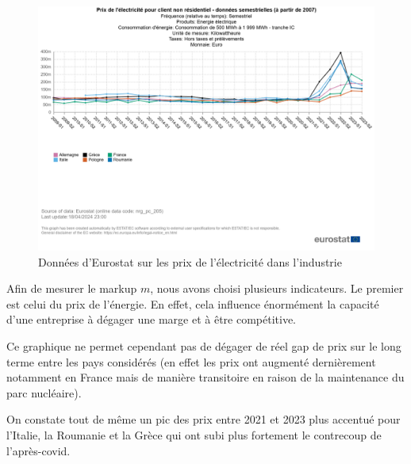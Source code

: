\documentclass{article}
\begin{document}
\begin{figure}[H]
  \centering
  \begin{minipage}{0.8\textwidth}
      \centering
      \includegraphics[width=\textwidth]{"prix_elec_2.png"}
      \caption{Données d'Eurostat sur les prix de l'électricité dans l'industrie}
  \end{minipage}
\end{figure}
\vspace{0.5cm}

Afin de mesurer le markup $m$, nous avons choisi plusieurs indicateurs. Le premier est celui du prix de l'énergie. En effet, cela influence énormément la capacité d'une entreprise à dégager une marge et à être compétitive.

Ce graphique ne permet cependant pas de dégager de réel gap de prix sur le long terme entre les pays considérés (en effet les prix ont augmenté dernièrement notamment en France mais de manière transitoire en raison de la maintenance du parc nucléaire).

On constate tout de même un pic des prix entre 2021 et 2023 plus accentué pour l'Italie, la Roumanie et la Grèce qui ont subi plus fortement le contrecoup de l'après-covid.
\end{document}
